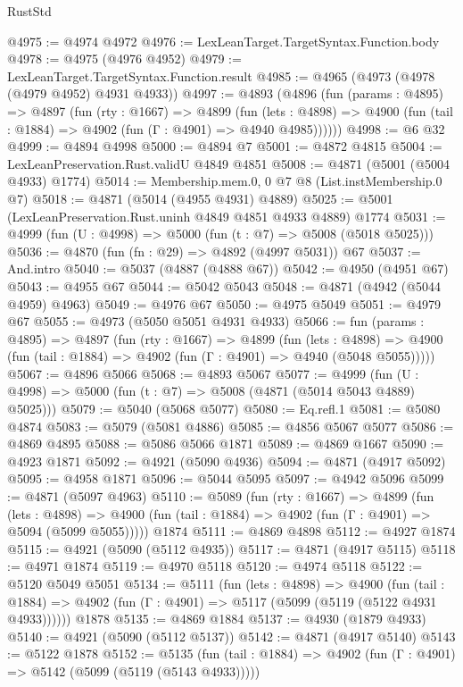 \begin{lexlean}{RustStd}
\begin{coremodule}
{\begin{coremodule}
{{{{{{{{{{{{{{{{{{{{{{{{{{{{{@4975 := @4974 @4972
@4976 := LexLeanTarget.TargetSyntax.Function.body
@4978 := @4975 (@4976 @4952)
@4979 := LexLeanTarget.TargetSyntax.Function.result
@4985 := @4965 (@4973 (@4978 (@4979 @4952) @4931 @4933))
@4997 := @4893
    (@4896
      (fun (params : @4895) =>
      @4897
        (fun (rty : @1667) =>
        @4899
          (fun (lets : @4898) =>
          @4900 (fun (tail : @1884) => @4902 (fun (Γ : @4901) => @4940 @4985))))))
@4998 := @6 @32
@4999 := @4894 @4998
@5000 := @4894 @7
@5001 := @4872 @4815
@5004 := LexLeanPreservation.Rust.validU @4849 @4851
@5008 := @4871 (@5001 (@5004 @4933) @1774)
@5014 := Membership.mem.{0, 0} @7 @8 (List.instMembership.{0} @7)
@5018 := @4871 (@5014 (@4955 @4931) @4889)
@5025 := @5001 (LexLeanPreservation.Rust.uninh @4849 @4851 @4933 @4889) @1774
@5031 := @4999 (fun (U : @4998) => @5000 (fun (t : @7) => @5008 (@5018 @5025)))
@5036 := @4870 (fun (fn : @29) => @4892 (@4997 @5031)) @67
@5037 := And.intro
@5040 := @5037 (@4887 (@4888 @67))
@5042 := @4950 (@4951 @67)
@5043 := @4955 @67
@5044 := @5042 @5043
@5048 := @4871 (@4942 (@5044 @4959) @4963)
@5049 := @4976 @67
@5050 := @4975 @5049
@5051 := @4979 @67
@5055 := @4973 (@5050 @5051 @4931 @4933)
@5066 := fun (params : @4895) =>
  @4897
    (fun (rty : @1667) =>
    @4899
      (fun (lets : @4898) =>
      @4900 (fun (tail : @1884) => @4902 (fun (Γ : @4901) => @4940 (@5048 @5055)))))
@5067 := @4896 @5066
@5068 := @4893 @5067
@5077 := @4999 (fun (U : @4998) => @5000 (fun (t : @7) => @5008 (@4871 (@5014 @5043 @4889) @5025)))
@5079 := @5040 (@5068 @5077)
@5080 := Eq.refl.{1}
@5081 := @5080 @4874
@5083 := @5079 (@5081 @4886)
@5085 := @4856 @5067 @5077
@5086 := @4869 @4895
@5088 := @5086 @5066 @1871
@5089 := @4869 @1667
@5090 := @4923 @1871
@5092 := @4921 (@5090 @4936)
@5094 := @4871 (@4917 @5092)
@5095 := @4958 @1871
@5096 := @5044 @5095
@5097 := @4942 @5096
@5099 := @4871 (@5097 @4963)
@5110 := @5089
    (fun (rty : @1667) =>
    @4899
      (fun (lets : @4898) =>
      @4900 (fun (tail : @1884) => @4902 (fun (Γ : @4901) => @5094 (@5099 @5055)))))
    @1874
@5111 := @4869 @4898
@5112 := @4927 @1874
@5115 := @4921 (@5090 (@5112 @4935))
@5117 := @4871 (@4917 @5115)
@5118 := @4971 @1874
@5119 := @4970 @5118
@5120 := @4974 @5118
@5122 := @5120 @5049 @5051
@5134 := @5111
    (fun (lets : @4898) =>
    @4900
      (fun (tail : @1884) => @4902 (fun (Γ : @4901) => @5117 (@5099 (@5119 (@5122 @4931 @4933))))))
    @1878
@5135 := @4869 @1884
@5137 := @4930 (@1879 @4933)
@5140 := @4921 (@5090 (@5112 @5137))
@5142 := @4871 (@4917 @5140)
@5143 := @5122 @1878
@5152 := @5135
    (fun (tail : @1884) => @4902 (fun (Γ : @4901) => @5142 (@5099 (@5119 (@5143 @4933)))))
}}}}}}}}}}}}}}}}}}}}}}}}}}}}}
\end{coremodule}}
\end{coremodule}
\end{lexlean}
